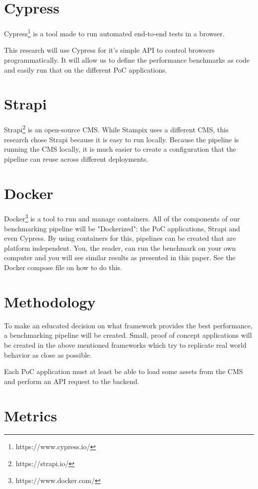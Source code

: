 \section{Cypress}

Cypress\footnote{https://www.cypress.io/} is a tool made to run automated end-to-end tests in a browser. 

This research will use Cypress for it's simple API to control browsers programmatically. It will allow us to define the performance benchmarks as code and easily run that on the different PoC applications.

\section{Strapi}

Strapi\footnote{https://strapi.io/} is an open-source CMS. While Stampix uses a different CMS, this research chose Strapi because it is easy to run locally. 
Because the pipeline is running the CMS locally, it is much easier to create a configuration that the pipeline can reuse across different deployments. 


\section{Docker}

Docker\footnote{https://www.docker.com/} is a tool to run and manage containers. All of the components of our benchmarking pipeline will be "Dockerized": the PoC applications, Strapi and even Cypress. 
By using containers for this, pipelines can be created that are platform independent. 
You, the reader, can run the benchmark on your own computer and you will see similar results as presented in this paper. See the Docker compose file on how to do this.


\section{Methodology}

To make an educated decision on what framework provides the best performance, a benchmarking pipeline will be created. 
Small, proof of concept applications will be created in the above mentioned frameworks which try to replicate real world behavior as close as possible.

Each PoC application must at least be able to load some assets from the CMS and perform an API request to the backend.


\section{Metrics}

